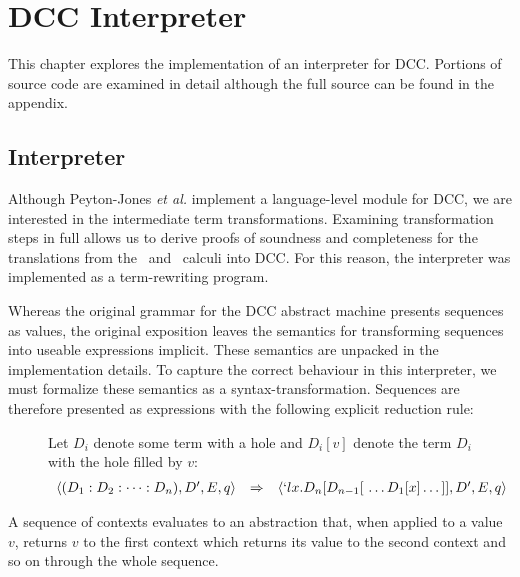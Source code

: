 \chapter{DCC Interpreter}

This chapter explores the implementation of an interpreter for DCC. Portions of source code are examined in detail although the full source can be found in the appendix.

\section{Interpreter}

Although Peyton-Jones \emph{et al.} implement a language-level module for DCC, we are interested in the intermediate term transformations. Examining transformation steps in full allows us to derive proofs of soundness and completeness for the translations from the \lam\ and \lmu\ calculi into DCC. For this reason, the interpreter was implemented as a term-rewriting program.

Whereas the original grammar for the DCC abstract machine presents sequences as values, the original exposition leaves the semantics for transforming sequences into useable expressions implicit. These semantics are unpacked in the implementation details. To capture the correct behaviour in this interpreter, we must formalize these semantics as a syntax-transformation. Sequences are therefore presented as expressions with the following explicit reduction rule:

\begin{figure}[!h]\label{fig:sequence-to-abstraction}
\begin{definition}
\item Let $D_i$ denote some term with a hole and $D_i[v]$ denote the term $D_i$ with the hole filled by $v$:
\[
\begin{array}{rclr}
  \langle 
    (D_1:D_2:\dots:D_n) ,
    D^\prime,
    E,
    q
  \rangle 
    &\Rightarrow&
  \langle 
    `lx.D_n[D_{n-1}[\ \dots D_1[x]\dots ]],
    D^\prime,
    E,
    q
  \rangle 
\end{array}
\]
\end{definition}
\end{figure}

A sequence of contexts evaluates to an abstraction that, when applied to a value $v$, returns $v$ to the first context which returns its value to the second context and so on through the whole sequence.
 
